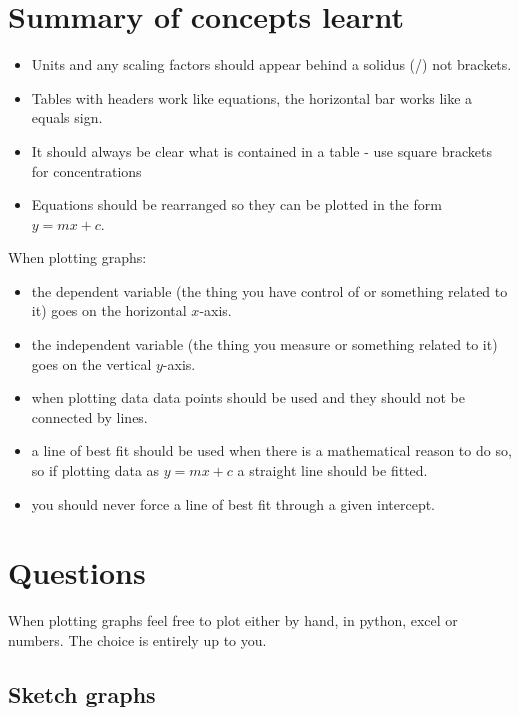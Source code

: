 \documentclass[
]{book}
\providecommand{\tightlist}{%
  \setlength{\itemsep}{0pt}\setlength{\parskip}{0pt}}
\begin{document}
\hypertarget{sec:summary3}{%
\section{Summary of concepts learnt}\label{sec:summary3}}

\begin{itemize}
\tightlist
\item
  Units and any scaling factors should appear behind a solidus (/) not brackets.
\item
  Tables with headers work like equations, the horizontal bar works like a equals sign.
\item
  It should always be clear what is contained in a table - use square brackets for concentrations
\item
  Equations should be rearranged so they can be plotted in the form \(y=mx+c\).
\end{itemize}

When plotting graphs:

\begin{itemize}
\tightlist
\item
  the dependent variable (the thing you have control of or something related to it) goes on the horizontal \(x\)-axis.
\item
  the independent variable (the thing you measure or something related to it) goes on the vertical \(y\)-axis.
\item
  when plotting data data points should be used and they should not be connected by lines.
\item
  a line of best fit should be used when there is a mathematical reason to do so, so if plotting data as \(y=mx+c\) a straight line should be fitted.
\item
  you should never force a line of best fit through a given intercept.
\end{itemize}

\hypertarget{sec:Questions3}{%
\section{Questions}\label{sec:Questions3}}

When plotting graphs feel free to plot either by hand, in python, excel or numbers. The choice is entirely up to you.

\hypertarget{subsec:sketch}{%
\subsection{Sketch graphs}\label{subsec:sketch}}
\end{document}
